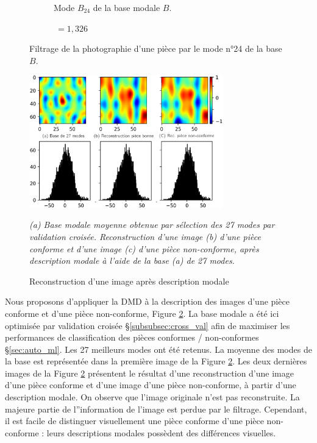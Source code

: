 \begin{figure}[htb]
\begin{subfigure}[c]{0.37\textwidth}
		\caption{Mode $B_{24}$ de la base modale $B$.}
	\end{subfigure}
	\begin{subfigure}[r]{0.20\textwidth}
		$\ = 1,326$
	\end{subfigure}
	\caption{Filtrage de la photographie d'une pièce par le mode n°24 de la base $B$.}
	\label{fig:dmd_filtering}
\end{figure}

\bigskip

\begin{figure}[bht]
	\centering
	\includegraphics[width=0.75\textwidth]{../Chap2/Figures/DMD_reconstruction_27modes.png}
	\caption{Reconstruction d'une image après description modale}
	\textit{(a) Base modale moyenne obtenue par sélection des 27 modes par validation croisée. Reconstruction d'une image (b) d'une pièce conforme et d'une image (c) d'une pièce non-conforme, après description modale à l'aide de la base (a) de 27 modes.}
	\label{fig:dmd_reconstruction}
\end{figure}

Nous proposons d'appliquer la DMD à la description des images d'une pièce conforme et d'une pièce non-conforme, Figure \ref{fig:dmd_reconstruction}.
La base modale a été ici optimisée par validation croisée §\ref{subsubsec:cross_val} afin de maximiser les performances de classification des pièces conformes / non-conformes §\ref{sec:auto_ml}.
Les 27 meilleurs modes ont été retenus.
La moyenne des modes de la base est représentée dans la première image de la Figure \ref{fig:dmd_reconstruction}.
Les deux dernières images de la Figure \ref{fig:dmd_reconstruction} présentent le résultat d'une reconstruction d'une image d'une pièce conforme et d'une image d'une pièce non-conforme, à partir d'une description modale.
On observe que l'image originale n'est pas reconstruite.
La majeure partie de l''information de l'image est perdue par le filtrage.
Cependant, il est facile de distinguer visuellement une pièce conforme d'une pièce non-conforme : leurs descriptions modales possèdent des différences visuelles.

